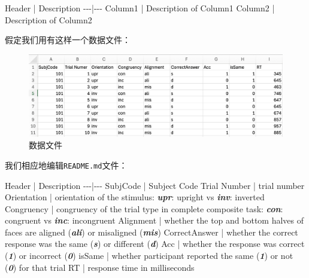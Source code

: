 \documentclass[]{ctexbook}
\newenvironment{Shaded}{\begin{snugshade}}{\end{snugshade}}
\newcommand{\InformationTok}[1]{\textcolor[rgb]{0.56,0.35,0.01}{\textbf{\textit{#1}}}}
\newcommand{\NormalTok}[1]{#1}
\theoremstyle{definition}
\theoremstyle{definition}
\theoremstyle{definition}
\theoremstyle{definition}
\theoremstyle{remark}
\begin{document}
\begin{Shaded}
\begin{Highlighting}[]

\NormalTok{Header | Description}
\NormalTok{{-}{-}{-}|{-}{-}{-}}
\NormalTok{Column1 | Description of Column1}
\NormalTok{Column2 | Description of Column2}
\end{Highlighting}
\end{Shaded}

假定我们用有这样一个数据文件：

\begin{figure}

{\centering \includegraphics[width=1\linewidth]{img/vscode/mkreadme_datafile} 

}

\caption{数据文件}\label{fig:mkreadme-datafile}
\end{figure}

我们相应地编辑\texttt{README.md}文件：

\begin{Shaded}
\begin{Highlighting}[]

\NormalTok{Header | Description}
\NormalTok{{-}{-}{-}|{-}{-}{-}}
\NormalTok{SubjCode | Subject Code}
\NormalTok{Trial Number | trial number}
\NormalTok{Orientation | orientation of the stimulus: }\InformationTok{\textasciigrave{}upr\textasciigrave{}}\NormalTok{: upright vs }\InformationTok{\textasciigrave{}inv\textasciigrave{}}\NormalTok{: inverted}
\NormalTok{Congruency | congruency of the trial type in complete composite task: }\InformationTok{\textasciigrave{}con\textasciigrave{}}\NormalTok{: congruent vs }\InformationTok{\textasciigrave{}inc\textasciigrave{}}\NormalTok{: incongruent}
\NormalTok{Alignment | whether the top and bottom halves of faces are aligned (}\InformationTok{\textasciigrave{}ali\textasciigrave{}}\NormalTok{) or misaligned (}\InformationTok{\textasciigrave{}mis\textasciigrave{}}\NormalTok{)}
\NormalTok{CorrectAnswer | whether the correct response was the same (}\InformationTok{\textasciigrave{}s\textasciigrave{}}\NormalTok{) or different (}\InformationTok{\textasciigrave{}d\textasciigrave{}}\NormalTok{)}
\NormalTok{Acc | whether the response was correct (}\InformationTok{\textasciigrave{}1\textasciigrave{}}\NormalTok{) or incorrect (}\InformationTok{\textasciigrave{}0\textasciigrave{}}\NormalTok{)}
\NormalTok{isSame | whether participant reported the same (}\InformationTok{\textasciigrave{}1\textasciigrave{}}\NormalTok{) or not (}\InformationTok{\textasciigrave{}0\textasciigrave{}}\NormalTok{) for that trial}
\NormalTok{RT | response time in milliseconds}
\end{Highlighting}
\end{Shaded}
\end{document}
